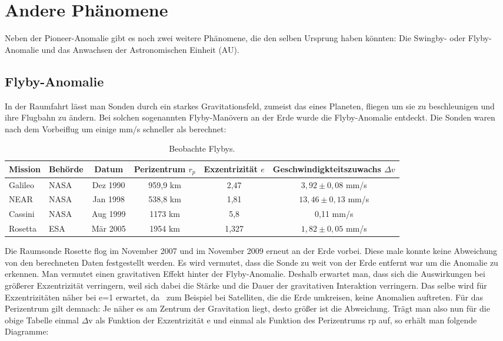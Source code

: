 \section{Andere Ph\"anomene}

Neben der Pioneer-Anomalie gibt es noch zwei weitere Ph\"anomene, die
den selben Ursprung haben k\"onnten: \foreignlanguage{ngerman}{Die}
Swingby- oder Flyby-Anomalie und das Anwachsen der Astronomischen
Einheit (AU)\cite{Laemmerzahl2006}.

\subsection{Flyby-Anomalie}

In der Raumfahrt l\"asst man Sonden durch ein starkes Gravitationsfeld,
zumeist das eines Planeten, fliegen um sie zu beschleunigen und ihre
Flugbahn zu \"andern. Bei solchen sogenannten Flyby-Man\"overn an der
Erde wurde die Flyby-Anomalie entdeckt. Die Sonden waren nach dem
Vorbeiflug um einige mm/s schneller als berechnet:


\begin{table}[!htbn]
\caption{Beobachte Flybys. \label{Table:flyby}}
\begin{center}
\begin{tabular}{|llcccc|}\hline
Mission & Behörde & Datum & Perizentrum $r_p$ & Exzentrizität $e$ & Geschwindigkteitszuwachs $\Delta v$ \\ \hline 
Galileo & NASA & Dez 1990 & 959,9 km & 2,47 & $3,92 \pm 0,08$ mm/s \\
NEAR & NASA & Jan 1998 & 538,8 km & 1,81 & $13,46 \pm 0,13$ mm/s \\
Cassini & NASA & Aug 1999 & 1173 km & 5,8 & 0,11 mm/s \\ 
Rosetta & ESA & Mär 2005 & 1954 km & 1,327 & $1,82 \pm 0,05$ mm/s \\ \hline
\end{tabular}
\end{center}
\end{table}

Die Raumsonde Rosette flog im November 2007 und im November 2009 erneut
an der Erde vorbei. Diese male konnte keine Abweichung von den
berechneten Daten festgestellt werden. Es wird vermutet, dass die Sonde
zu weit von der Erde entfernt war um die Anomalie zu erkennen. Man
vermutet einen gravitativen Effekt hinter der Flyby-Anomalie. Deshalb
erwartet man, dass sich die Auswirkungen bei gr\"o{\ss}erer
Exzentrizit\"at verringern, weil sich dabei die St\"arke und die Dauer
der gravitativen Interaktion verringern. Das selbe wird f\"ur
Exzentrizit\"aten n\"aher bei e=1 erwartet, da \ zum Beispiel bei
Satelliten, die die Erde umkreisen, keine Anomalien auftreten. F\"ur
das Perizentrum gilt demnach: Je n\"aher es am Zentrum der Gravitation
liegt, desto gr\"o{\ss}er ist die Abweichung. Tr\"agt man also nun
f\"ur die obige Tabelle einmal $\Delta $v als Funktion der
Exzentrizit\"at e und einmal als Funktion des Perizentrums rp auf, so
erh\"alt man folgende Diagramme:

